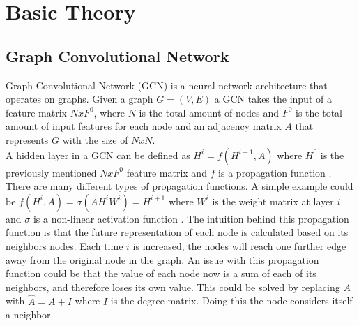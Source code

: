 \section{Basic Theory}

\subsection{Graph Convolutional Network}
Graph Convolutional Network (GCN) is a neural network architecture that operates on graphs.
Given a graph $G = (V,E)$ a GCN takes the input of a feature matrix $N x F^0$, where $N$ is the total amount of nodes and $F^0$ is the total amount of input features for each node and an adjacency matrix $A$ that represents $G$ with the size of $N x N$.\\
\indent
A hidden layer in a GCN can be defined as $H^i = f(H^{i-1}, A)$ where $H^0$ is the previously mentioned $N x F^0$ feature matrix and $f$ is a propagation function \cite{Deep-Learning-on-Graphs-with-GCN}.
There are many different types of propagation functions.
A simple example could be $f(H^i, A) = \sigma(AH^iW^i) = H^{i+1}$ where $W^i$ is the weight matrix at layer $i$ and $\sigma$ is a non-linear activation function \cite{Deep-Learning-on-Graphs-with-GCN}.
The intuition behind this propagation function is that the future representation of each node is calculated based on its neighbors nodes.
Each time $i$ is increased, the nodes will reach one further edge away from the original node in the graph. %
An issue with this propagation function could be that the value of each node now is a sum of each of its neighbors, and therefore loses its own value.
This could be solved by replacing $A$ with $\hat{A} = A + I$ where $I$ is the degree matrix.
Doing this the node considers itself a neighbor.